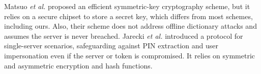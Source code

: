 %
%



Matsuo \textit{et al.} \cite{MatsuoMY11} proposed an efficient symmetric-key cryptography scheme, but it relies on a secure chipset to store a secret key, which differs from most schemes, including ours. Also, their scheme does not address offline dictionary attacks and assumes the server is never breached. 
%
Jarecki \textit{et al.} \cite{JareckiJKSS21} introduced a protocol for single-server scenarios, safeguarding against PIN extraction and user impersonation even if the server or token is compromised. It relies on symmetric and asymmetric encryption and  hash functions.


